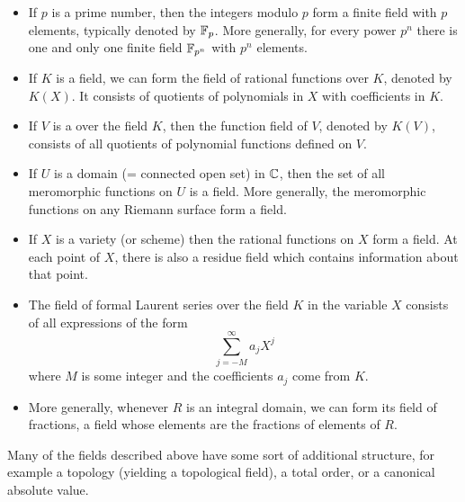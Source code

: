 \documentclass[12pt]{article}
\begin{document}
\begin{itemize}
\item If $p$ is a prime number, then the integers modulo $p$ form a
finite field with $p$ elements, typically denoted by $\Bbb{F}_p$. More
generally, for every  power $p^n$ there is one and only one
finite field $\Bbb{F}_{p^n}$ with $p^n$ elements.

\item If $K$ is a field, we can form the field of rational functions
over $K$, denoted by $K(X)$. It consists of quotients of polynomials
in $X$ with coefficients in $K$.

\item  If $V$ is a  over the field $K$, then the function field of $V$, denoted by
$K(V)$, consists of all quotients of polynomial functions defined on $V$.

\item If $U$ is a domain (= connected open set) in $\Bbb{C}$, then the
set of all meromorphic functions on $U$ is a field. More generally, the  meromorphic functions on any Riemann surface form a field.

\item If $X$ is a variety (or scheme) then the rational functions on $X$ form a field.  At each point of $X$, there is also a residue field which contains information about that point.

\item The field of formal Laurent series over the field $K$ in the
variable $X$ consists
of all expressions of the form
$$\sum_{j=-M}^\infty a_j X^j$$
where $M$ is some integer and the coefficients $a_j$ come from $K$.

\item More generally, whenever $R$ is an integral domain, we can form
its field of fractions, a field whose elements are the
fractions of elements of $R$.

\end{itemize}

Many of the fields described above have some sort of additional structure, for example a topology (yielding a topological field), a total order, or a canonical absolute value.
\end{document}
